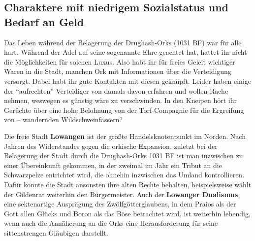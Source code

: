 \subsection[Charaktere mit niedrigem Sozialstatus]{Charaktere mit niedrigem Sozialstatus und Bedarf an Geld}
Das Leben während der Belagerung der Drughash-Orks (1031 BF) war für alle hart.
Während der Adel auf seine sogenannte Ehre geachtet hat, hattet ihr nicht die Möglichkeiten für solchen Luxus.
Also habt ihr für freies Geleit wichtiger Waren in die Stadt, manchen Ork mit Informationen über die Verteidigung versorgt.
Dabei habt ihr gute Kontakten mit diesen geknüpft.
Leider haben einige der \enquote{aufrechten} Verteidiger von damals davon erfahren und wollen Rache nehmen, weswegen es günstig wäre zu verschwinden.
In den Kneipen hört ihr Gerüchte über eine hohe Belohnung von der Torf-Compagnie für die Ergreifung von -- wandernden Wildschweinfässern?

\spaltenende


\spaltenanfang



Die freie Stadt \textbf{Lowangen} ist der größte Handelsknotenpunkt im Norden.
Nach Jahren des Widerstandes gegen die orkische Expansion, zuletzt bei der Belagerung der Stadt durch die Drughash-Orks 1031 BF ist man inzwischen zu einer Übereinkunft gekommen, in der zweimal im Jahr ein Tribut an die Schwarzpelze entrichtet wird, die ohnehin inzwischen das Umland kontrollieren.
Dafür konnte die Stadt ansonsten ihre alten Rechte behalten, beispielsweise wählt der Gildenrat weiterhin den Bürgermeister.
Auch der \textbf{Lowanger Dualismus}, eine sektenartige Ausprägung des Zwölfgötterglaubens, in dem Praios als der Gott allen Glücks und Boron als das Böse betrachtet wird, ist weiterhin lebendig, wenn auch die Annäherung an die Orks eine Herausforderung für seine sittenstrengen Gläubigen darstellt.


